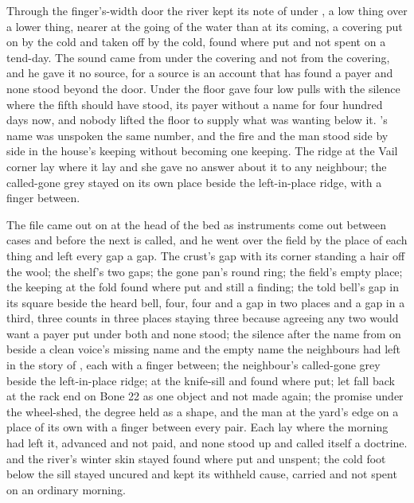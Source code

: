 Through the finger's-width door the river kept its note of  under , a low thing over a lower thing, nearer at the going of the water than at its coming, a covering put on by the cold and taken off by the cold, found where put and not spent on a tend-day. The sound came from under the covering and not from the covering, and he gave it no source, for a source is an account that has found a payer and none stood beyond the door. Under the floor  gave four low pulls with the silence where the fifth should have stood, its payer without a name for four hundred days now, and nobody lifted the floor to supply what was wanting below it. 's name was unspoken the same number, and the fire and the man stood side by side in the house's keeping without becoming one keeping. The ridge at the Vail corner lay where it lay and she gave no answer about it to any neighbour; the called-gone grey stayed on its own place beside the left-in-place ridge, with a finger between.

The file came out on  at the head of the bed as instruments come out between cases and before the next is called, and he went over the field by the place of each thing and left every gap a gap. The crust's gap with its corner standing a hair off the wool; the shelf's two gaps; the gone pan's round ring; the field's empty place; the keeping at the fold found where put and still a finding; the told bell's gap in its square beside the heard bell, four, four and a gap in two places and a gap in a third, three counts in three places staying three because agreeing any two would want a payer put under both and none stood; the silence after the name from  on  beside a clean voice's missing name and the empty name the neighbours had left in the story of , each with a finger between; the neighbour's called-gone grey beside the left-in-place ridge;  at the knife-sill and  found where put;  let fall back at the rack end on Bone 22 as one object and not made again; the promise under the wheel-shed, the degree held as a shape, and the man at the yard's edge on a place of its own with a finger between every pair. Each lay where the morning had left it, advanced and not paid, and none stood up and called itself a doctrine.  and the river's winter skin stayed found where put and unspent; the cold foot below the sill stayed uncured and  kept its withheld cause, carried and not spent on an ordinary morning.

